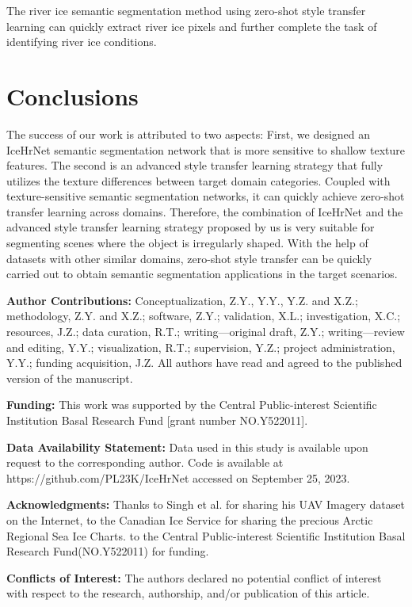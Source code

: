 \documentclass[a4paper,fleqn]{cas-dc}
\begin{document}
The river ice semantic segmentation method using zero-shot style transfer learning can quickly extract river ice pixels and further complete the task of identifying river ice conditions.

\section{Conclusions}

The success of our work is attributed to two aspects: First, we designed an IceHrNet semantic segmentation network that is more sensitive to shallow texture features. The second is an advanced style transfer learning strategy that fully utilizes the texture differences between target domain categories. Coupled with texture-sensitive semantic segmentation networks, it can quickly achieve zero-shot transfer learning across domains. Therefore, the combination of IceHrNet and the advanced style transfer learning strategy proposed by us is very suitable for segmenting scenes where the object is irregularly shaped. With the help of datasets with other similar domains, zero-shot style transfer can be quickly carried out to obtain semantic segmentation applications in the target scenarios.

\textbf{Author Contributions:} Conceptualization, Z.Y., Y.Y., Y.Z. and X.Z.; methodology, Z.Y. and X.Z.; software, Z.Y.; validation, X.L.; investigation, X.C.; resources, J.Z.; data curation, R.T.; writing—original draft, Z.Y.; writing—review and editing, Y.Y.; visualization, R.T.; supervision, Y.Z.; project administration, Y.Y.; funding acquisition, J.Z. All authors have read and agreed to the published version of the manuscript.

\textbf{Funding:} This work was supported by the Central Public-interest Scientific Institution Basal Research Fund [grant number NO.Y522011].

\textbf{Data Availability Statement: }Data used in this study is available upon request to the corresponding author. Code is available at https://github.com/PL23K/IceHrNet accessed on September 25, 2023.

\textbf{Acknowledgments:} Thanks to Singh et al. for sharing his UAV Imagery dataset on the Internet, to the Canadian Ice Service for sharing the precious Arctic Regional Sea Ice Charts. to the Central Public-interest Scientific Institution Basal Research Fund(NO.Y522011) for funding.

\textbf{Conflicts of Interest:} The authors declared no potential conflict of interest with respect to the research, authorship, and/or publication of this article.
\end{document}
